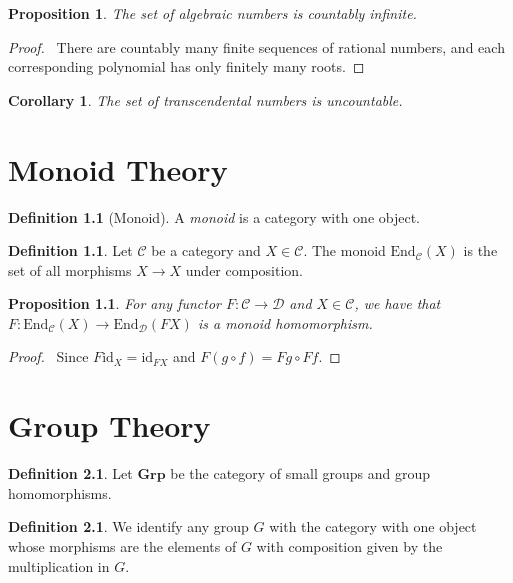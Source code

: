 \documentclass{book}
\let\qed\relax
\newtheorem{prop}[ax]{Proposition}
\newtheorem{cor}{Corollary}[ax]
\theoremstyle{definition}
\newtheorem{df}[ax]{Definition}
\newcommand{\id}[1]{\ensuremath{\mathrm{id}_{#1}}}
\begin{document}
\begin{prop}
The set of algebraic numbers is countably infinite.
\end{prop}

\begin{proof}
\pf\ There are countably many finite sequences of rational numbers, and each corresponding polynomial has only finitely many roots. \qed
\end{proof}

\begin{cor}
The set of transcendental numbers is uncountable.
\end{cor}

\chapter{Monoid Theory}

\begin{df}[Monoid]
A \emph{monoid} is a category with one object.
\end{df}

\begin{df}
Let $\mathcal{C}$ be a category and $X \in \mathcal{C}$. The monoid $\mathrm{End}_\mathcal{C}(X)$ is the set of all morphisms $X \rightarrow X$ under composition.
\end{df}

\begin{prop}
For any functor $F : \mathcal{C} \rightarrow \mathcal{D}$ and $X \in \mathcal{C}$, we have that $F : \mathrm{End}_\mathcal{C}(X) \rightarrow \mathrm{End}_\mathcal{D}(FX)$ is a monoid homomorphism.
\end{prop}

\begin{proof}
\pf\ Since $F \id{X} = \id{FX}$ and $F(g \circ f) = Fg \circ Ff$. \qed
\end{proof}

\chapter{Group Theory}

\begin{df}
Let $\mathbf{Grp}$ be the category of small groups and group homomorphisms.
\end{df}

\begin{df}
We identify any group $G$ with the category with one object whose morphisms are the elements of $G$ with composition given by the multiplication in $G$.
\end{df}
\end{document}
